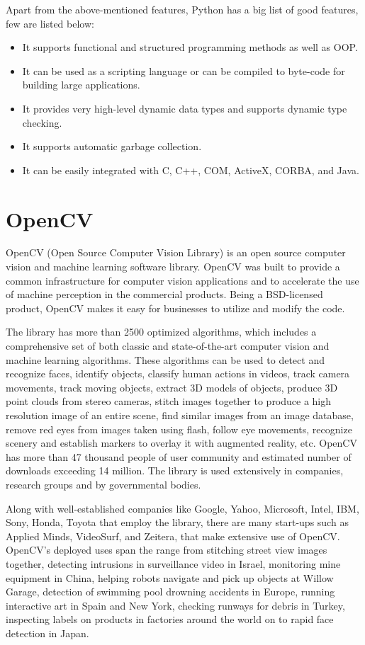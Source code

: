 Apart from the above-mentioned features, Python has a big list of good features, few are listed below:
\begin{itemize}
	\item It supports functional and structured programming methods as well as OOP.
\item It can be used as a scripting language or can be compiled to byte-code for building large applications.
\item It provides very high-level dynamic data types and supports dynamic type checking.
\item It supports automatic garbage collection.
\item It can be easily integrated with C, C++, COM, ActiveX, CORBA, and Java.

\end{itemize}
\section{OpenCV}
OpenCV (Open Source Computer Vision Library) is an open source computer vision and machine learning software library. OpenCV was built to provide a common infrastructure for computer vision applications and to accelerate the use of machine perception in the commercial products. Being a BSD-licensed product, OpenCV makes it easy for businesses to utilize and modify the code.\par
The library has more than 2500 optimized algorithms, which includes a comprehensive set of both classic and state-of-the-art computer vision and machine learning algorithms. These algorithms can be used to detect and recognize faces, identify objects, classify human actions in videos, track camera movements, track moving objects, extract 3D models of objects, produce 3D point clouds from stereo cameras, stitch images together to produce a high resolution image of an entire scene, find similar images from an image database, remove red eyes from images taken using flash, follow eye movements, recognize scenery and establish markers to overlay it with augmented reality, etc. OpenCV has more than 47 thousand people of user community and estimated number of downloads exceeding 14 million. The library is used extensively in companies, research groups and by governmental bodies.\par
Along with well-established companies like Google, Yahoo, Microsoft, Intel, IBM, Sony, Honda, Toyota that employ the library, there are many start-ups such as Applied Minds, VideoSurf, and Zeitera, that make extensive use of OpenCV. OpenCV’s deployed uses span the range from stitching street view images together, detecting intrusions in surveillance video in Israel, monitoring mine equipment in China, helping robots navigate and pick up objects at Willow Garage, detection of swimming pool drowning accidents in Europe, running interactive art in Spain and New York, checking runways for debris in Turkey, inspecting labels on products in factories around the world on to rapid face detection in Japan.\par
